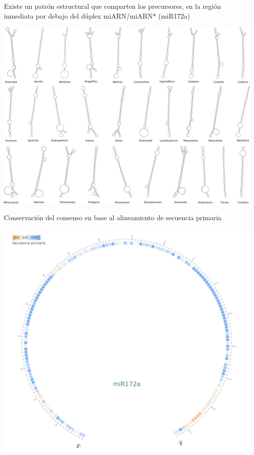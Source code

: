\documentclass{beamer}
\begin{document}
\begin{frame}{Existe un patrón estructural que comparten los precursores, en la región inmediata por debajo del dúplex miARN/miARN* (miR172a)}
	\begin{center}
		\includegraphics[width=.8\textwidth]{img/miR172a_rnafold.png}
	\end{center}
    \begin{center}
    \end{center}
\end{frame}

\begin{frame}{Conservación del consenso en base al alineamiento de secuencia primaria}
	\begin{center}
		\includegraphics[width=.8\textwidth]{img/miR172a_circos01.png}
	\end{center}
\end{frame}
\end{document}
